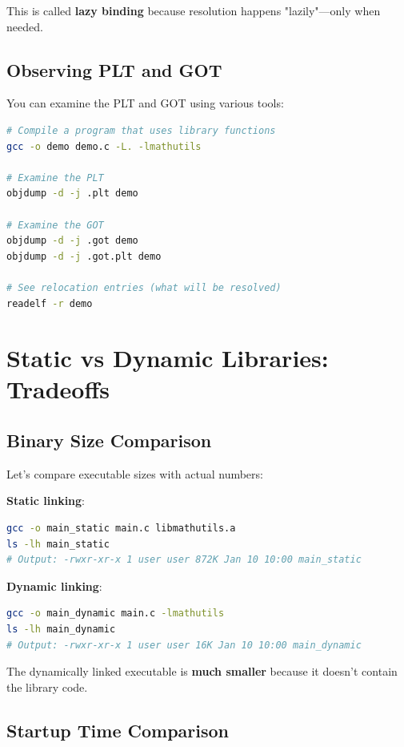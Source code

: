 This is called \textbf{lazy binding} because resolution happens "lazily"—only when needed.

\subsection{Observing PLT and GOT}

You can examine the PLT and GOT using various tools:

\begin{lstlisting}[language=bash]
# Compile a program that uses library functions
gcc -o demo demo.c -L. -lmathutils

# Examine the PLT
objdump -d -j .plt demo

# Examine the GOT
objdump -d -j .got demo
objdump -d -j .got.plt demo

# See relocation entries (what will be resolved)
readelf -r demo
\end{lstlisting}

\section{Static vs Dynamic Libraries: Tradeoffs}

\subsection{Binary Size Comparison}

Let's compare executable sizes with actual numbers:

\textbf{Static linking}:
\begin{lstlisting}[language=bash]
gcc -o main_static main.c libmathutils.a
ls -lh main_static
# Output: -rwxr-xr-x 1 user user 872K Jan 10 10:00 main_static
\end{lstlisting}

\textbf{Dynamic linking}:
\begin{lstlisting}[language=bash]
gcc -o main_dynamic main.c -lmathutils
ls -lh main_dynamic
# Output: -rwxr-xr-x 1 user user 16K Jan 10 10:00 main_dynamic
\end{lstlisting}

The dynamically linked executable is \textbf{much smaller} because it doesn't contain the library code.

\subsection{Startup Time Comparison}

